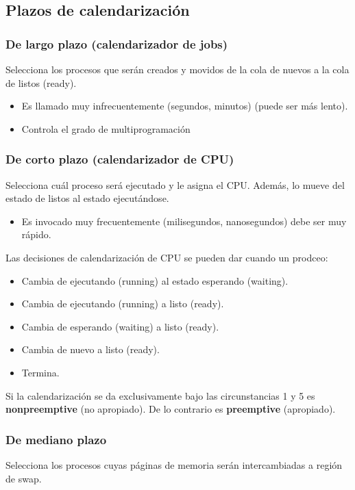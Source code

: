 \documentclass[a4paper, 11pt]{article}
\begin{document}
\subsection{Plazos de calendarización}
\subsubsection{De largo plazo (calendarizador de jobs)}
Selecciona los procesos que serán creados y movidos de la cola de nuevos a la cola de listos (ready).
\begin{itemize}
    \item Es llamado muy infrecuentemente (segundos, minutos) (puede ser más lento).
    \item Controla el grado de multiprogramación
\end{itemize}

\subsubsection{De corto plazo (calendarizador de CPU)}
Selecciona cuál proceso será ejecutado y le asigna el CPU. Además, lo mueve del estado de listos al estado ejecutándose.
\begin{itemize}
    \item Es invocado muy frecuentemente (milisegundos, nanosegundos) debe ser muy rápido.
\end{itemize}
Las decisiones de calendarización de CPU se pueden dar cuando un prodceo:
\begin{itemize}
    \item Cambia de ejecutando (running) al estado esperando (waiting).
    \item Cambia de ejecutando (running) a listo (ready).
    \item Cambia de esperando (waiting) a listo (ready).
    \item Cambia de nuevo a listo (ready).
    \item Termina.
\end{itemize}

Si la calendarización se da exclusivamente bajo las circunstancias 1 y 5 es \textbf{nonpreemptive} (no apropiado). De lo contrario es \textbf{preemptive} (apropiado).

\subsubsection{De mediano plazo}
Selecciona los procesos cuyas páginas de memoria serán intercambiadas a región de swap.
\end{document}
